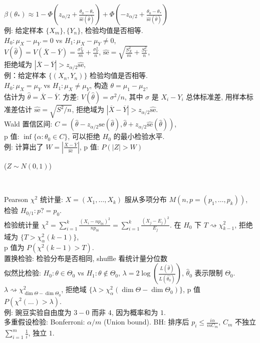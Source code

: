 \documentclass[a4paper, landscape,10pt]{article}
\begin{document}
\begin{multicols}{4}
$\beta(\theta_*)\approx
1 - \Phi(z_{\alpha / 2} + \frac{\theta_0 - \theta_*}{\hat {\mathrm{se}}(\hat \theta)})
+\Phi(-z_{\alpha / 2} + \frac{\theta_0 - \theta_*}{\hat {\mathrm{se}}(\hat \theta)})$\\
例: 给定样本 $\{X_m\}, \{Y_n\}$, 检验均值是否相等. \\
$H_0: \mu_X - \mu_Y = 0$ vs $H_1: \mu_X - \mu_Y \neq 0$, \\
$V(\hat \theta) = V(\overline X - \overline Y) = \frac{\sigma_X^2}{m} + \frac{\sigma_Y^2}{n}$, 
$\hat {\mathrm{se}} = \sqrt{\frac{S_X^2}{m} + \frac{S_Y^2}{n}}$, \\
拒绝域为
$|\overline X - \overline Y| > z_{\alpha / 2} \hat {\mathrm{se}}$, \\
例：给定样本 $\{(X_n, Y_n)\}$ 检验均值是否相等. \\
$H_0: \mu_X = \mu_Y$ vs $H_1: \mu_X \neq \mu_Y$, 构造 $\theta = \mu_1 - \mu_2$, \\
估计为 $\hat \theta = \overline X - \overline Y$.
方差: $V(\hat \theta) =  \sigma^2/n$, 其中 $\sigma$ 是 $X_i - Y_i$ 总体标准差, 用样本标准差估计
$\hat{\mathrm{se}} = \sqrt{S^2/n}$, 拒绝域为 $|\overline X - \overline Y| > z_{\alpha / 2} \hat {\mathrm{se}}$. \\
Wald 置信区间: $C = \left(\hat \theta - z_{\alpha / 2} \hat {\mathrm{se}}(\hat \theta), \hat \theta + z_{\alpha / 2} \hat {\mathrm{se}}(\hat \theta)\right)$, \\
p 值: $\inf \{\alpha : \theta_0 \in C\}$, 可以拒绝 $H_0$ 的最小检验水平. \\
例: 计算出了 $W = \left| \frac{\overline X - \overline Y}{\hat {\mathrm{se}}}\right|$, p 值: $P(|Z| > W)$\begin{tiny}($Z\sim N(0, 1)$)\end{tiny} \\

\newcolumn

Pearson $\chi^2$ 统计量: $X= (X_1, \dots, X_k)$ 服从多项分布 $M(n, p=(p_1, \dots, p_k))$,
检验 $H_{0/1}: p ?= p_0$. \\
检验统计量 $\chi^2 = \sum_{i = 1}^k \frac{(X_i - np_{0i})^2}{np_{0i}} = \sum_{i=1}^k \frac{(X_j - E_j)^2}{E_j}$.
在 $H_0$ 下 $T \rightsquigarrow \chi^2_{k - 1}$, 拒绝域为 $\{T > \chi^2_{\alpha}(k - 1)\}$,\\
p 值为 $P(\chi^2(k - 1) > T)$. \\
置换检验: 检验分布是否相同, shuffle 看统计量分位数\\
似然比检验: $H_0: \theta \in \Theta_0$ vs $H_1: \theta \notin \Theta_0$, $\lambda = 2\log\left( \frac {L(\hat \theta)} {L(\hat {\theta_0})}\right)$,
$\hat \theta_0$ 表示限制 $\Theta_0$.
$\lambda \rightsquigarrow \chi^2_{\dim \Theta - \dim \Theta_0}$, 拒绝域 $\{\lambda > \chi^2_{\alpha}(\dim \Theta - \dim \Theta_0)\}$,
p 值 $P(\chi^2(\dots) > \lambda)$. \\
例: 豌豆实验自由度为 $3-0$ 而非 $4$, 因为概率和为 $1$. \\
多重假设检验: Bonferroni: $\alpha / m$ (Union bound).
BH: 排序后 $p_i \leq \frac{i \alpha}{m C_m} $, $C_m$ 不独立 $\sum_{i = 1}^m \frac{1}{i}$, 独立 $1$. \\
\setcounter{section}{12}

\end{multicols}
\end{document}
